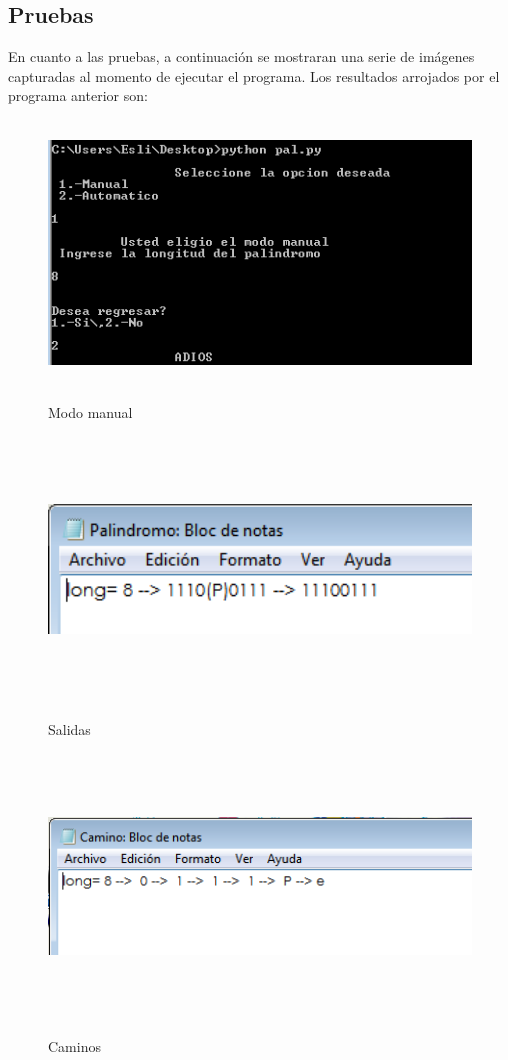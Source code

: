 \documentclass[12pt]{article}
\begin{document}
\subsection{Pruebas}
En cuanto a las pruebas, a continuación se mostraran una serie de imágenes capturadas al momento de ejecutar el programa. Los resultados arrojados por el programa anterior son:

\begin{figure}[H]
\includegraphics[width=\textwidth, height=7cm]{manual_pal}
\label{fig:manual_afn}
\caption{Modo manual}
\end{figure}

\begin{figure}[H]
\includegraphics[width=\textwidth, height=7cm]{manual_pal_salida}
\label{fig:manual_afn}
\caption{Salidas}
\end{figure}

\begin{figure}[H]
\includegraphics[width=\textwidth, height=7cm]{manual_pal_caminos}
\label{fig:manual_afn}
\caption{Caminos}
\end{figure}
\end{document}
